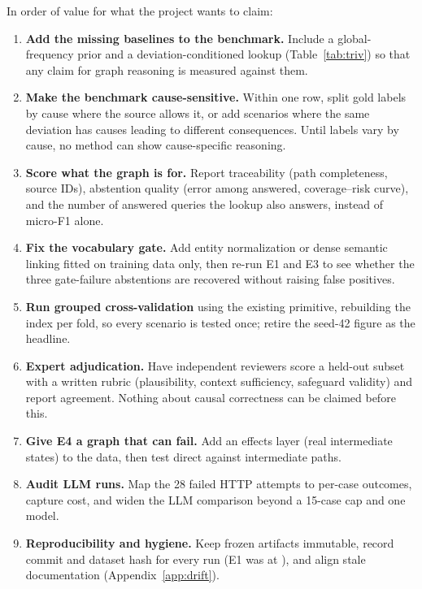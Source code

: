 \documentclass[10pt,twocolumn,a4paper]{extarticle}
\begin{document}
In order of value for what the project wants to claim:
\begin{enumerate}[itemsep=2pt]
  \item \textbf{Add the missing baselines to the benchmark.} Include a global-frequency prior and a deviation-conditioned lookup (Table~\ref{tab:triv}) so that any claim for graph reasoning is measured against them.
  \item \textbf{Make the benchmark cause-sensitive.} Within one row, split gold labels by cause where the source allows it, or add scenarios where the same deviation has causes leading to different consequences. Until labels vary by cause, no method can show cause-specific reasoning.
  \item \textbf{Score what the graph is for.} Report traceability (path completeness, source IDs), abstention quality (error among answered, coverage--risk curve), and the number of answered queries the lookup also answers, instead of micro-F1 alone.
  \item \textbf{Fix the vocabulary gate.} Add entity normalization or dense semantic linking fitted on training data only, then re-run E1 and E3 to see whether the three gate-failure abstentions are recovered without raising false positives.
  \item \textbf{Run grouped cross-validation} using the existing  primitive, rebuilding the index per fold, so every scenario is tested once; retire the seed-42 figure as the headline.
  \item \textbf{Expert adjudication.} Have independent reviewers score a held-out subset with a written rubric (plausibility, context sufficiency, safeguard validity) and report agreement. Nothing about causal correctness can be claimed before this.
  \item \textbf{Give E4 a graph that can fail.} Add an effects layer (real intermediate states) to the data, then test direct against intermediate paths.
  \item \textbf{Audit LLM runs.} Map the 28 failed HTTP attempts to per-case outcomes, capture cost, and widen the LLM comparison beyond a 15-case cap and one model.
  \item \textbf{Reproducibility and hygiene.} Keep frozen artifacts immutable, record commit and dataset hash for every run (E1 was at ), and align stale documentation (Appendix~\ref{app:drift}).
\end{enumerate}

\end{document}
